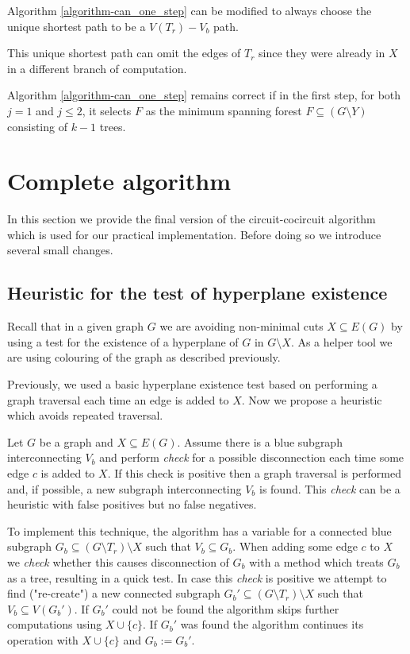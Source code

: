 \begin{cor}
	Algorithm \ref{algorithm-can_one_step} can be modified to always choose the unique shortest path to be a $V(T_r){-}V_b$ path.
\end{cor}

This unique shortest path can omit the edges of $T_r$ since they were already in $X$ in a different branch of computation.

\begin{claim}
	\label{forest_sel_claim}
	Algorithm \ref{algorithm-can_one_step} remains correct if in the first step, for both $j = 1$ and $j \leq 2$, it selects $F$ as the minimum spanning forest ${F \subseteq (G \setminus Y)}$ consisting of $k-1$ trees.
\end{claim}

\section{Complete algorithm}

In this section we provide the final version of the circuit-cocircuit algorithm which is used for our practical implementation. Before doing so we introduce several small changes.


\subsection*{Heuristic for the test of hyperplane existence}
Recall that in a given graph $G$ we are avoiding non-minimal cuts $X \subseteq E(G)$ by using a test for the existence of a hyperplane of $G$ in $G \setminus X$. As a helper tool we are using colouring of the graph as described previously.

Previously, we used a basic hyperplane existence test based on performing a graph traversal each time an edge is added to $X$. Now we propose a heuristic which avoids repeated traversal.

\begin{claim}
	Let $G$ be a graph and $X \subseteq E(G)$. Assume there is a blue subgraph interconnecting $V_b$ and perform \textit{check} for a possible disconnection each time some edge $c$ is added to $X$. If this check is positive then a graph traversal is performed and, if possible, a new subgraph interconnecting $V_b$ is found. This \textit{check} can be a heuristic with false positives but no false negatives.
\end{claim}

To implement this technique, the algorithm has a variable for a connected blue subgraph $G_b \subseteq (G \setminus T_r) \setminus X$ such that $V_b \subseteq G_b$. When adding some edge $c$ to $X$ we \textit{check} whether this causes disconnection of $G_b$ with a method which treats $G_b$ as a tree, resulting in a quick test. In case this \textit{check} is positive we attempt to find ("re-create") a new connected subgraph $G_b' \subseteq (G \setminus T_r) \setminus X$ such that $V_b \subseteq V(G_b')$. If $G_b'$ could not be found the algorithm skips further computations using $X \cup \{c\}$. If $G_b'$ was found the algorithm continues its operation with $X \cup \{c\}$ and $G_b := G_b'$.

